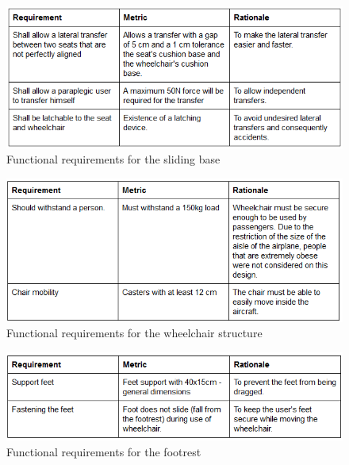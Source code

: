 \newpage

\begin{figure}[h!]
  \centering
     \includegraphics[scale=1]{images/functional_requirements_sliding_base.png}
   \caption{Functional requirements for the sliding base}
  \label{fig:fun_req_sliding_base}
\end{figure}

\newpage

\begin{figure}[h!]
  \centering
     \includegraphics[scale=1]{images/functional_requirements_wheelchair_structure.png}
   \caption{Functional requirements for the wheelchair structure}
  \label{fig:fun_req_wheelchair_structure}
\end{figure}

\newpage

\begin{figure}[h!]
  \centering
     \includegraphics[scale=1]{images/functional_requirements_footrest.png}
   \caption{Functional requirements for the footrest}
  \label{fig:fun_req_footrest}
\end{figure}


